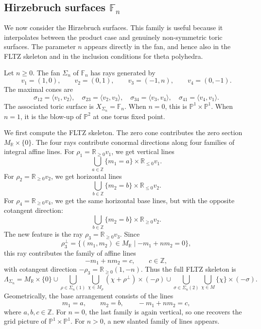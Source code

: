 \subsection{Hirzebruch surfaces \texorpdfstring{$\mathbb F_n$}{Fn}}

We now consider the Hirzebruch surfaces. This family is useful because it
interpolates between the product case and genuinely non-symmetric toric
surfaces. The parameter \(n\) appears directly in the fan, and hence also in
the FLTZ skeleton and in the inclusion conditions for theta polyhedra.

Let \(n\ge 0\). The fan \(\Sigma_n\) of \(\mathbb F_n\) has rays generated by
\[
v_1=(1,0),\qquad
v_2=(0,1),\qquad
v_3=(-1,n),\qquad
v_4=(0,-1).
\]
The maximal cones are
\[
\sigma_{12}=\langle v_1,v_2\rangle,\quad
\sigma_{23}=\langle v_2,v_3\rangle,\quad
\sigma_{34}=\langle v_3,v_4\rangle,\quad
\sigma_{41}=\langle v_4,v_1\rangle.
\]
The associated toric surface is \(X_{\Sigma_n}=\mathbb F_n\). When \(n=0\), this is \(\mathbb P^1\times\mathbb P^1\). When \(n=1\), it is the blow-up of \(\mathbb P^2\) at one torus fixed point.

We first compute the FLTZ skeleton. The zero cone contributes the zero section
\(M_{\mathbb R}\times\{0\}\). The four rays contribute conormal directions
along four families of integral affine lines. For \(\rho_1=\mathbb R_{\ge 0}v_1\),
we get vertical lines
\[
\bigcup_{a\in\mathbb Z}\{m_1=a\}\times \mathbb R_{\le 0}v_1.
\]
For \(\rho_2=\mathbb R_{\ge 0}v_2\), we get horizontal lines
\[
\bigcup_{b\in\mathbb Z}\{m_2=b\}\times \mathbb R_{\le 0}v_2.
\]
For \(\rho_4=\mathbb R_{\ge 0}v_4\), we get the same horizontal base lines, but
with the opposite cotangent direction:
\[
\bigcup_{b\in\mathbb Z}\{m_2=b\}\times \mathbb R_{\ge 0}v_2.
\]
The new feature is the ray \(\rho_3=\mathbb R_{\ge 0}v_3\). Since
\[
\rho_3^\perp=\{(m_1,m_2)\in M_{\mathbb R}\mid -m_1+nm_2=0\},
\]
this ray contributes the family of affine lines
\[
-m_1+nm_2=c,\qquad c\in\mathbb Z,
\]
with cotangent direction \(-\rho_3=\mathbb R_{\ge 0}(1,-n)\). Thus the full
FLTZ skeleton is
\[
\Lambda_{\Sigma_n}
=
M_{\mathbb R}\times\{0\}
\cup
\bigcup_{\rho\in\Sigma_n(1)}
\bigcup_{\chi\in M_\rho}
(\chi+\rho^\perp)\times(-\rho)
\cup
\bigcup_{\sigma\in\Sigma_n(2)}
\bigcup_{\chi\in M}
\{\chi\}\times(-\sigma).
\]
Geometrically, the base arrangement consists of the lines
\[
m_1=a,\qquad m_2=b,\qquad -m_1+nm_2=c,
\]
where \(a,b,c\in\mathbb Z\). For \(n=0\), the last family is again vertical, so
one recovers the grid picture of \(\mathbb P^1\times\mathbb P^1\). For \(n>0\),
a new slanted family of lines appears.

